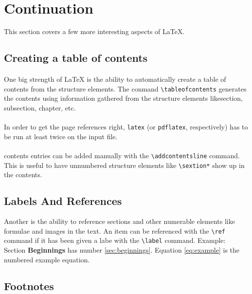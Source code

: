 \documentclass{article}
\begin{document}
\section{Continuation}

This section covers a few more interesting aspects of {\LaTeX}.


\subsection{Creating a table of contents}
\paragraph{}One big strength of {\LaTeX} is the ability to automatically create a table of contents from the
structure elements. The conmand \verb+\tableofcontents+ generates the contents using  information gathered from the structure elements likesection, subsection, chapter, etc.

\paragraph{} In order to get the page references right, \verb+latex+ (or \verb+pdflatex+, respectively) has to be run at least twice on the input file.

\paragraph{} contents entries can be added manually with the \verb+\addcontentsline+ command.
This is useful to have unnumbered structure elements like \verb+\sextion*+ show up in the contents.

\subsection{Labels And References}

Another is the ability to reference  sections and other numerable elements like formulae
and images in the text. An item can be referenced with the \verb+\ref+ command if it has been given a labe with the \verb+\label+ command.  Example: Section \textbf{Beginnings} has number \ref{sec:beginnings}.
Equation \ref{eq:example} is the numbered example equation.

\subsection{Footnotes}
\end{document}
